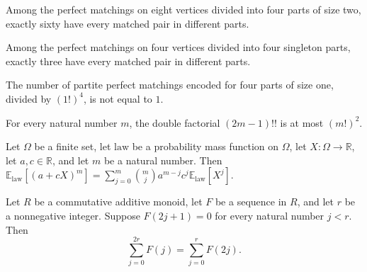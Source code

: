 \begin{theorem}
\label{FABL.card_partitePerfectMatching_four_two}
\leanok
{}
Among the perfect matchings on eight vertices divided into four parts of size two,
exactly sixty have every matched pair in different parts.
\end{theorem}

\begin{theorem}
\label{FABL.card_partitePerfectMatching_four_one}
\leanok
{}
Among the perfect matchings on four vertices divided into four singleton parts, exactly
three have every matched pair in different parts.
\end{theorem}

\begin{theorem}
\label{FABL.exercise9_37b_printed_multiplicity_counterexample}
\leanok
{}
The number of partite perfect matchings encoded for four parts of size one, divided by
$(1!)^4$, is not equal to $1$.
\end{theorem}

\begin{theorem}
\label{FABL.oddDoubleFactorial_le_factorial_sq}
\leanok
{}
For every natural number $m$, the double factorial $(2m-1)!!$ is at most $(m!)^2$.
\end{theorem}

\begin{theorem}
\label{FABL.pmfExpectation_affine_pow}
\leanok
{}
Let $\Omega$ be a finite set, let $\mathrm{law}$ be a probability mass function on
$\Omega$, let $X:\Omega\to\mathbb R$, let $a,c\in\mathbb R$, and let $m$ be a natural
number. Then $\mathbb
E_{\mathrm{law}}[(a+cX)^m]=\sum_{j=0}^{m}\binom{m}{j}a^{m-j}c^j\mathbb
E_{\mathrm{law}}[X^j]$.
\end{theorem}

\begin{theorem}
\label{FABL.sum_range_two_mul_add_one_eq_sum_even}
\leanok
{}
Let $R$ be a commutative additive monoid, let $F$ be a sequence in $R$, and let $r$ be a
nonnegative integer. Suppose $F(2j+1)=0$ for every natural number $j<r$. Then
\[\sum_{j=0}^{2r}F(j)=\sum_{j=0}^{r}F(2j).\]
\end{theorem}


